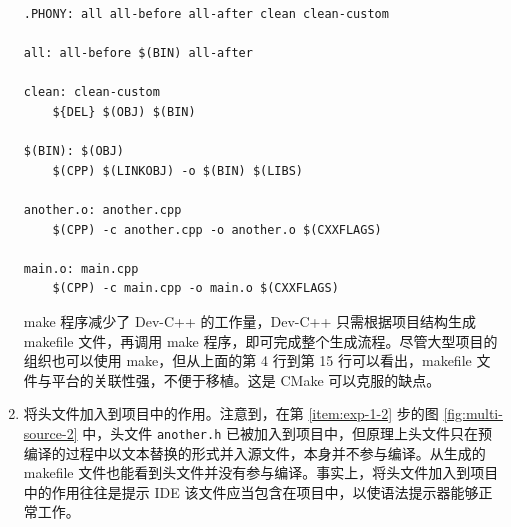 \begin{enumerate}
\begin{lstlisting}[language={[gnu]make}]
.PHONY: all all-before all-after clean clean-custom

all: all-before $(BIN) all-after

clean: clean-custom
	${DEL} $(OBJ) $(BIN)

$(BIN): $(OBJ)
	$(CPP) $(LINKOBJ) -o $(BIN) $(LIBS)

another.o: another.cpp
	$(CPP) -c another.cpp -o another.o $(CXXFLAGS)

main.o: main.cpp
	$(CPP) -c main.cpp -o main.o $(CXXFLAGS)
	\end{lstlisting}

	make 程序减少了 Dev-C++ 的工作量，Dev-C++ 只需根据项目结构生成 makefile 文件，再调用 make 程序，即可完成整个生成流程。尽管大型项目的组织也可以使用 make，但从上面的第 4 行到第 15 行可以看出，makefile 文件与平台的关联性强，不便于移植。这是 CMake 可以克服的缺点。

	\item 将头文件加入到项目中的作用。注意到，在第 \ref{item:exp-1-2} 步的图 \ref{fig:multi-source-2} 中，头文件 \lstinline[language={}]{another.h} 已被加入到项目中，但原理上头文件只在预编译的过程中以文本替换的形式并入源文件，本身并不参与编译。从生成的 makefile 文件也能看到头文件并没有参与编译。事实上，将头文件加入到项目中的作用往往是提示 IDE 该文件应当包含在项目中，以使语法提示器能够正常工作。
\end{enumerate}
